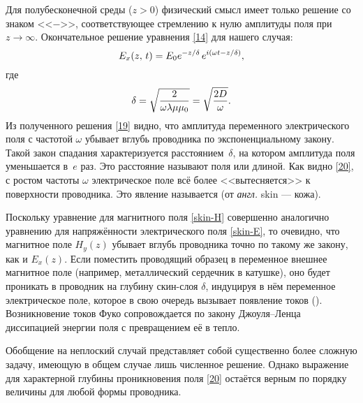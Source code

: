 Для полубесконечной среды ($z>0$) физический смысл имеет только решение
со знаком <<$-$>>, соответствующее стремлению к нулю амплитуды поля 
при $z\to \infty$. 
Окончательное решение уравнения \eqref{14} для нашего случая:
\begin{equation} \eqmark{19}
E_x(z,\,t)=E_0e^{-z/\delta}\,e^{i(\omega t- z/\delta)},
\end{equation}
где
\begin{equation} \eqmark{20}
\delta = \sqrt{\frac{2}{\omega\lambda\mu\mu_0}} = \sqrt{\frac{2D}{\omega}}.
\end{equation}
Из полученного решения \eqref{19} видно, что амплитуда переменного
электрического поля с частотой $\omega$ убывает вглубь
проводника по экспоненциальному закону. 
Такой закон спадания характеризуется расстоянием~$\delta$, 
на котором амплитуда поля уменьшается в~$e$ раз. 
Это расстояние называют  поля
или  длиной.
Как видно \eqref{20}, 
с ростом частоты $\omega$ электрическое поле всё более <<вытесняется>> 
к поверхности проводника. Это явление называется 
(от \emph{англ.} skin --- кожа). 

Поскольку уравнение для магнитного поля \eqref{skin-H} совершенно аналогично
уравнению для напряжённости электрического поля \eqref{skin-E}, то очевидно, 
что магнитное поле $H_y(z)$ убывает вглубь проводника точно по такому же закону, 
как и $E_x(z)$. Если поместить проводящий образец в переменное внешнее магнитное поле
(например, металлический сердечник в катушке),
оно будет проникать в проводник на глубину скин-слоя $\delta$, индуцируя в нём
переменное электрическое поле, которое в свою очередь 
вызывает появление токов (). Возникновение токов Фуко
сопровождается по закону Джоуля--Ленца диссипацией энергии поля с превращением
её в тепло.

Обобщение на неплоский случай представляет собой
существенно более сложную задачу, имеющую в общем случае лишь численное решение.
Однако выражение для характерной глубины проникновения поля \eqref{20} 
остаётся верным по порядку величины для любой формы проводника.

